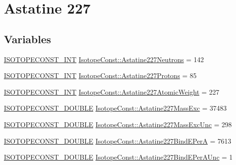 \hypertarget{group___isotope_const-_astatine-_at227}{}\section{Astatine 227}
\label{group___isotope_const-_astatine-_at227}
\subsection*{Variables}
\begin{DoxyCompactItemize}
\item 
\mbox{\hyperlink{group___isotope_const-_macros_ga5f18360b3e99483a35c32d789e62621c}{I\+S\+O\+T\+O\+P\+E\+C\+O\+N\+S\+T\+\_\+\+I\+NT}} \mbox{\hyperlink{group___isotope_const-_astatine-_at227_ga520bff0a6066246a4432432cf4fcb66d}{Isotope\+Const\+::\+Astatine227\+Neutrons}} = 142
\item 
\mbox{\hyperlink{group___isotope_const-_macros_ga5f18360b3e99483a35c32d789e62621c}{I\+S\+O\+T\+O\+P\+E\+C\+O\+N\+S\+T\+\_\+\+I\+NT}} \mbox{\hyperlink{group___isotope_const-_astatine-_at227_ga10fb2bd76fcf1f0e996b9e980d147b9d}{Isotope\+Const\+::\+Astatine227\+Protons}} = 85
\item 
\mbox{\hyperlink{group___isotope_const-_macros_ga5f18360b3e99483a35c32d789e62621c}{I\+S\+O\+T\+O\+P\+E\+C\+O\+N\+S\+T\+\_\+\+I\+NT}} \mbox{\hyperlink{group___isotope_const-_astatine-_at227_gaa19bd0a97be4f03ae55d080fd14870a1}{Isotope\+Const\+::\+Astatine227\+Atomic\+Weight}} = 227
\item 
\mbox{\hyperlink{group___isotope_const-_macros_ga8f45a7272ce02c0b4c65c44636ed719a}{I\+S\+O\+T\+O\+P\+E\+C\+O\+N\+S\+T\+\_\+\+D\+O\+U\+B\+LE}} \mbox{\hyperlink{group___isotope_const-_astatine-_at227_ga1d0641def1c1bba9b9451c94a74c7360}{Isotope\+Const\+::\+Astatine227\+Mass\+Exc}} = 37483
\item 
\mbox{\hyperlink{group___isotope_const-_macros_ga8f45a7272ce02c0b4c65c44636ed719a}{I\+S\+O\+T\+O\+P\+E\+C\+O\+N\+S\+T\+\_\+\+D\+O\+U\+B\+LE}} \mbox{\hyperlink{group___isotope_const-_astatine-_at227_ga489c1567f8f1f1313b9a937de80574af}{Isotope\+Const\+::\+Astatine227\+Mass\+Exc\+Unc}} = 298
\item 
\mbox{\hyperlink{group___isotope_const-_macros_ga8f45a7272ce02c0b4c65c44636ed719a}{I\+S\+O\+T\+O\+P\+E\+C\+O\+N\+S\+T\+\_\+\+D\+O\+U\+B\+LE}} \mbox{\hyperlink{group___isotope_const-_astatine-_at227_ga9d0220cfdbb82218a3a2894b86a56dac}{Isotope\+Const\+::\+Astatine227\+Bind\+E\+PerA}} = 7613
\item 
\mbox{\hyperlink{group___isotope_const-_macros_ga8f45a7272ce02c0b4c65c44636ed719a}{I\+S\+O\+T\+O\+P\+E\+C\+O\+N\+S\+T\+\_\+\+D\+O\+U\+B\+LE}} \mbox{\hyperlink{group___isotope_const-_astatine-_at227_ga3767730007e149d69b7cfdf9e7012112}{Isotope\+Const\+::\+Astatine227\+Bind\+E\+Per\+A\+Unc}} = 1

\end{DoxyCompactItemize}
